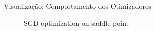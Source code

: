 \documentclass[aspectratio=1610]{beamer}
\begin{document}
\begin{frame}{Visualização: Comportamento dos Otimizadores}
\begin{figure}
\centering
{}
\caption{SGD optimization on saddle point}
\end{figure}
\end{frame}


\end{document}
